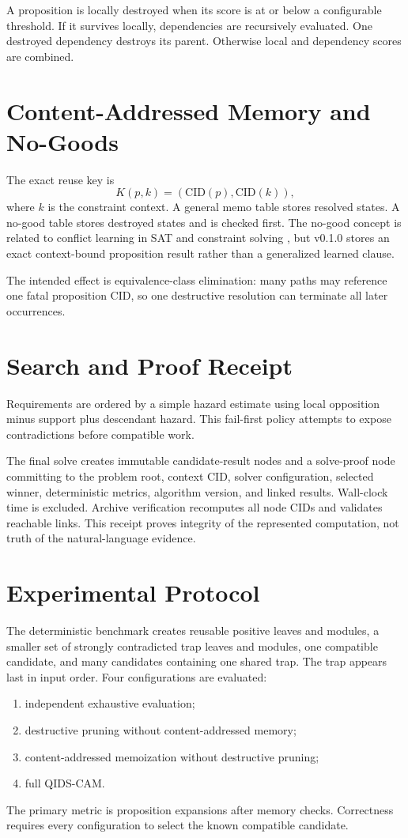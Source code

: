\documentclass[11pt]{article}
\begin{document}
A proposition is locally destroyed when its score is at or below a configurable threshold. If it survives locally, dependencies are recursively evaluated. One destroyed dependency destroys its parent. Otherwise local and dependency scores are combined.

\section{Content-Addressed Memory and No-Goods}
The exact reuse key is
\begin{equation}
K(p,k)=(\mathrm{CID}(p),\mathrm{CID}(k)),
\end{equation}
where $k$ is the constraint context. A general memo table stores resolved states. A no-good table stores destroyed states and is checked first. The no-good concept is related to conflict learning in SAT and constraint solving \cite{marquessilva2009}, but v0.1.0 stores an exact context-bound proposition result rather than a generalized learned clause.

The intended effect is equivalence-class elimination: many paths may reference one fatal proposition CID, so one destructive resolution can terminate all later occurrences.

\section{Search and Proof Receipt}
Requirements are ordered by a simple hazard estimate using local opposition minus support plus descendant hazard. This fail-first policy attempts to expose contradictions before compatible work.

The final solve creates immutable candidate-result nodes and a solve-proof node committing to the problem root, context CID, solver configuration, selected winner, deterministic metrics, algorithm version, and linked results. Wall-clock time is excluded. Archive verification recomputes all node CIDs and validates reachable links. This receipt proves integrity of the represented computation, not truth of the natural-language evidence.

\section{Experimental Protocol}
The deterministic benchmark creates reusable positive leaves and modules, a smaller set of strongly contradicted trap leaves and modules, one compatible candidate, and many candidates containing one shared trap. The trap appears last in input order. Four configurations are evaluated:
\begin{enumerate}
  \item independent exhaustive evaluation;
  \item destructive pruning without content-addressed memory;
  \item content-addressed memoization without destructive pruning;
  \item full QIDS-CAM.
\end{enumerate}
The primary metric is proposition expansions after memory checks. Correctness requires every configuration to select the known compatible candidate.
\end{document}

